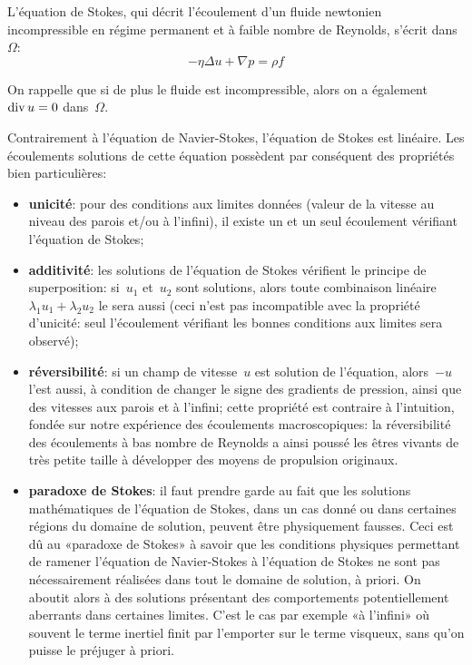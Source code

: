 \medskip
L'équation de Stokes, qui décrit l'écoulement d'un fluide newtonien incompressible en régime 
permanent et à faible nombre de Reynolds, 
s'écrit dans~$\Omega$:
\begin{equation}
-\eta \Delta u + \nabla p = \rho f
\end{equation}

On rappelle que si de plus le fluide est incompressible, alors on a également 
$\operatorname{div} u = 0$ dans~$\Omega$.


\medskip
Contrairement à l'équation de Navier-Stokes, l'équation de Stokes est linéaire.
Les écoulements solutions de cette équation possèdent par conséquent des propriétés bien particulières:
\begin{itemize}
  \item \textbf{unicité}: 
	pour des conditions aux limites données (valeur de la vitesse au niveau des parois et/ou à l'infini), 
	il existe un et un seul écoulement vérifiant l'équation de Stokes;
  \item \textbf{additivité}: 
	les solutions de l'équation de Stokes vérifient le principe de superposition: 
	si~$u_1$ et~$u_2$ sont solutions, alors toute combinaison linéaire~$\lambda_1 u_1 
	+ \lambda_2 u_2$ le sera aussi (ceci n'est pas incompatible avec la propriété d'unicité: seul 
	l'écoulement vérifiant les bonnes conditions aux limites sera observé);
  \item \textbf{réversibilité}: 
	si un champ de vitesse~$u$ est solution de l'équation, alors~$-u$ 
	l'est aussi, à condition de changer le signe des gradients de pression, ainsi que des vitesses aux 
	parois et à l'infini; cette propriété est contraire à l'intuition, fondée sur notre expérience 
	des écoulements macroscopiques: la réversibilité des écoulements à bas nombre de Reynolds 
	a ainsi poussé les êtres vivants de très petite taille à développer des moyens de propulsion originaux.
  \item \textbf{paradoxe de Stokes}: 
	il faut prendre garde au fait que les solutions mathématiques de l'équation de Stokes, 
	dans un cas donné ou dans certaines régions du domaine de solution, peuvent être 
	physiquement fausses. Ceci est dû au «paradoxe de Stokes» à savoir que les 
	conditions physiques permettant de ramener l'équation de Navier-Stokes à l'équation 
	de Stokes ne sont pas nécessairement réalisées dans tout le domaine de solution, à priori. 
	On aboutit alors à des solutions présentant des comportements potentiellement aberrants 
	dans certaines limites. C'est le cas par exemple «à l'infini» où souvent le terme inertiel 
	finit par l'emporter sur le terme visqueux, sans qu'on puisse le préjuger à priori.
\end{itemize}




